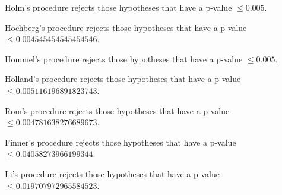 \documentclass[a4paper,10pt]{article}
\begin{document}
\begin{landscape}
Holm's procedure rejects those hypotheses that have a p-value $\le0.005$.


Hochberg's procedure rejects those hypotheses that have a p-value $\le0.004545454545454546$.


Hommel's procedure rejects those hypotheses that have a p-value $\le0.005$.


Holland's procedure rejects those hypotheses that have a p-value $\le0.005116196891823743$.


Rom's procedure rejects those hypotheses that have a p-value $\le0.004781638276689673$.


Finner's procedure rejects those hypotheses that have a p-value $\le0.04058273966199344$.


Li's procedure rejects those hypotheses that have a p-value $\le0.019707972965584523$.



\newpage


\end{landscape}
\end{document}
